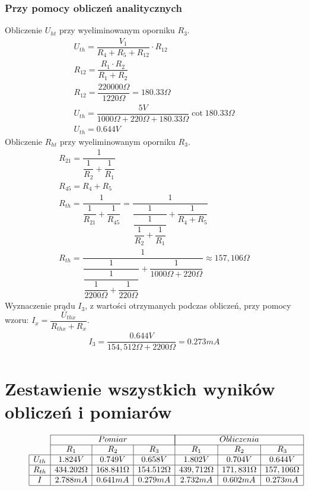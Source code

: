 \documentclass[polish,polish,a4paper]{article}
\begin{document}
\begin{spacing}{2}
	\subsubsection{Przy pomocy obliczeń analitycznych}
	Obliczenie $U_{ht}$ przy wyeliminowanym oporniku $ R_{3} $.
			\begin{gather*}
	U_{th}= \dfrac{V_{1}}{R_{4}+R_{5}+R_{12}} \cdot R_{12}\\
	R_{12} = \dfrac{R_{1} \cdot R_{2}}{R_{1} + R_{2}}\\
	R_{12} = \dfrac{220000\Omega}{1220\Omega} = 180.33\Omega\\
	U_{th} = \dfrac{5V}{1000\Omega + 220\Omega + 180.33\Omega } \cot 180.33\Omega\\
	U_{th} = 0.644V
	\end{gather*}
		Obliczenie $R_{ht}$ przy wyeliminowanym oporniku $ R_{3} $.
	\begin{gather*}
	R_{21} = \dfrac{1}{\dfrac{1}{R_{2}} + \dfrac{1}{R_{1}}}\\
	R_{45} = R_{4} + R_{5}\\
	R_{th} = \dfrac{1}{\dfrac{1}{R_{21}} + \dfrac{1}{R_{45}}} = \dfrac{1}{\dfrac{1}{\dfrac{1}{\dfrac{1}{R_{2}} + \dfrac{1}{R_{1}}}} + \dfrac{1}{R_{4} + R_{5}}}\\
	R_{th} = \dfrac{1}{\dfrac{1}{\dfrac{1}{\dfrac{1}{2200\Omega} + \dfrac{1}{220\Omega}}} + \dfrac{1}{1000\Omega + 220\Omega}} \approx 157,106\Omega
	\end{gather*}
		Wyznaczenie prądu $I_{3}$, z wartości otrzymanych podczas obliczeń, przy pomocy wzoru: $I_{x}= \dfrac{U_{thx}}{R_{thx} + R_{x}}$.
	\begin{gather*}
	I_{3}=\dfrac{0.644V}{154,512\Omega + 2200\Omega } = 0.273mA
	\end{gather*}
	\section{Zestawienie wszystkich wyników obliczeń i pomiarów}
		\begin{figure}[H]
			\begin{equation*}
			\begin{array}{|c|c|c|c|c|c|c|}
				\cline{2-7}
				\multicolumn{1}{c}{}&\multicolumn{3}{|c|}{Pomiar}&\multicolumn{3}{|c|}{Obliczenia}\\
				\cline{2-7}
				\multicolumn{1}{c|}{}&R_{1}&R_{2}&R_{3}&R_{1}&R_{2}&R_{3}\\
				\hline
				U_{th}&1.824V&0.749V&0.658V&1.802V&0.704V&0.644V\\
				\hline
				R_{th}&434.202\Omega&168.841\Omega&154.512\Omega&439,712\Omega&171,831\Omega&157,106\Omega\\
				\hline
				I&2.788mA&0.641mA&0.279mA&2.732mA&0.602mA&0.273mA\\
				\hline
				

\end{array}
\end{equation*}
\end{figure}
\end{spacing}
\end{document}
